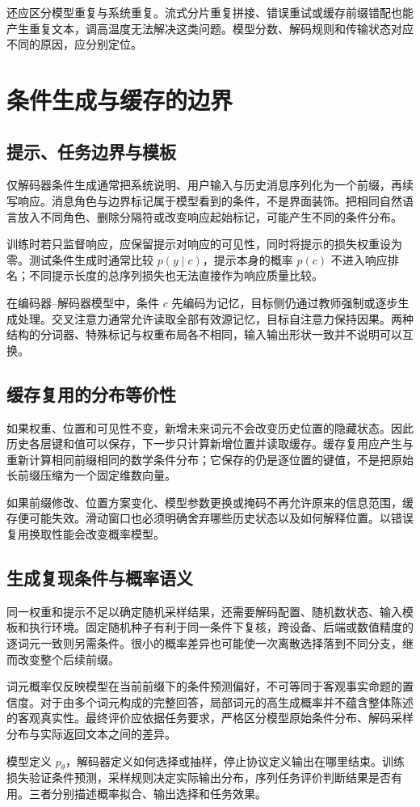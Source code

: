 \documentclass[../textbook.tex]{subfiles}
\begin{document}
还应区分模型重复与系统重复。流式分片重复拼接、错误重试或缓存前缀错配也能产生重复文本，调高温度无法解决这类问题。模型分数、解码规则和传输状态对应不同的原因，应分别定位。

\section{条件生成与缓存的边界}

\subsection{提示、任务边界与模板}
仅解码器条件生成通常把系统说明、用户输入与历史消息序列化为一个前缀，再续写响应。消息角色与边界标记属于模型看到的条件，不是界面装饰。把相同自然语言放入不同角色、删除分隔符或改变响应起始标记，可能产生不同的条件分布。

训练时若只监督响应，应保留提示对响应的可见性，同时将提示的损失权重设为零。测试条件生成时通常比较 $p(y\mid c)$，提示本身的概率 $p(c)$ 不进入响应排名；不同提示长度的总序列损失也无法直接作为响应质量比较。

在编码器--解码器模型中，条件 $c$ 先编码为记忆，目标侧仍通过教师强制或逐步生成处理。交叉注意力通常允许读取全部有效源记忆，目标自注意力保持因果。两种结构的分词器、特殊标记与权重布局各不相同，输入输出形状一致并不说明可以互换。

\subsection{缓存复用的分布等价性}
如果权重、位置和可见性不变，新增未来词元不会改变历史位置的隐藏状态。因此历史各层键和值可以保存，下一步只计算新增位置并读取缓存。缓存复用应产生与重新计算相同前缀相同的数学条件分布；它保存的仍是逐位置的键值，不是把原始长前缀压缩为一个固定维数向量。

如果前缀修改、位置方案变化、模型参数更换或掩码不再允许原来的信息范围，缓存便可能失效。滑动窗口也必须明确舍弃哪些历史状态以及如何解释位置。以错误复用换取性能会改变概率模型。

\subsection{生成复现条件与概率语义}
同一权重和提示不足以确定随机采样结果，还需要解码配置、随机数状态、输入模板和执行环境。固定随机种子有利于同一条件下复核，跨设备、后端或数值精度的逐词元一致则另需条件。很小的概率差异也可能使一次离散选择落到不同分支，继而改变整个后续前缀。

词元概率仅反映模型在当前前缀下的条件预测偏好，不可等同于客观事实命题的置信度。对于由多个词元构成的完整回答，局部词元的高生成概率并不蕴含整体陈述的客观真实性。最终评价应依据任务要求，严格区分模型原始条件分布、解码采样分布与实际返回文本之间的差异。

\begin{note}
模型定义 $p_\theta$，解码器定义如何选择或抽样，停止协议定义输出在哪里结束。训练损失验证条件预测，采样规则决定实际输出分布，序列任务评价判断结果是否有用。三者分别描述概率拟合、输出选择和任务效果。
\end{note}


\chapterreferences
\myendchapterdocument
\end{document}
